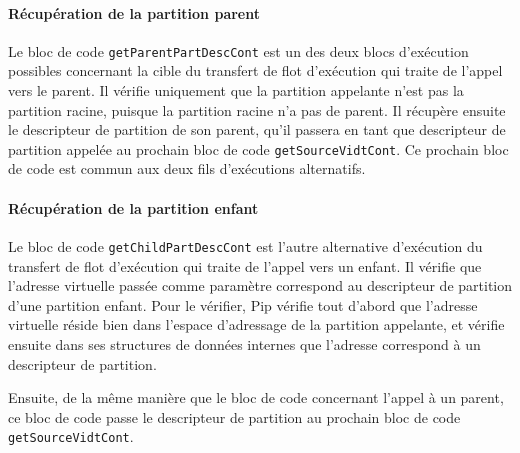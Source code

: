 
		\paragraph{Récupération de la partition parent}

		Le bloc de code \texttt{getParentPartDescCont} est un des deux blocs d'exécution possibles concernant la cible du transfert de flot d'exécution qui traite de l'appel vers le parent. Il vérifie uniquement que la partition appelante n'est pas la partition racine, puisque la partition racine n'a pas de parent. Il récupère ensuite le descripteur de partition de son parent, qu'il passera en tant que descripteur de partition appelée au prochain bloc de code \texttt{getSourceVidtCont}. Ce prochain bloc de code est commun aux deux fils d'exécutions alternatifs.


		\paragraph{Récupération de la partition enfant}

		Le bloc de code \texttt{getChildPartDescCont} est l'autre alternative d'exécution du transfert de flot d'exécution qui traite de l'appel vers un enfant. Il vérifie que l'adresse virtuelle passée comme paramètre correspond au descripteur de partition d'une partition enfant. Pour le vérifier, Pip vérifie tout d'abord que l'adresse virtuelle réside bien dans l'espace d'adressage de la partition appelante, et vérifie ensuite dans ses structures de données internes que l'adresse correspond à un descripteur de partition.

		Ensuite, de la même manière que le bloc de code concernant l'appel à un parent, ce bloc de code passe le descripteur de partition au prochain bloc de code \texttt{getSourceVidtCont}.


